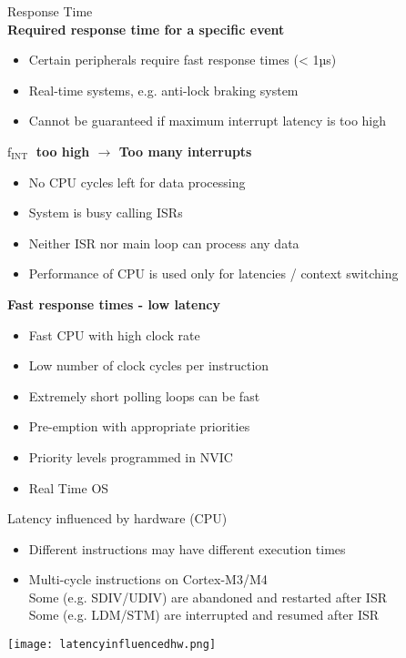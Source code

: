 \begin{corollary}{Response Time}\\
    \textbf{Required response time for a specific event}
    \begin{itemize}
        \item Certain peripherals require fast response times (< 1µs)
        \item Real-time systems, e.g. anti-lock braking system
        \item Cannot be guaranteed if maximum interrupt latency is too high
    \end{itemize}

\textbf{$\mathrm{f}_{\text {INT }}$ too high $\boldsymbol{\rightarrow}$ Too many interrupts}
\begin{itemize}
    \item No CPU cycles left for data processing
    \item System is busy calling ISRs
    \item Neither ISR nor main loop can process any data
    \item Performance of CPU is used only for latencies / context switching
\end{itemize}

\textbf{Fast response times - low latency}
\begin{itemize}
    \item Fast CPU with high clock rate
    \item Low number of clock cycles per instruction
    \item Extremely short polling loops can be fast
    \item Pre-emption with appropriate priorities
    \item Priority levels programmed in NVIC
    \item Real Time OS
\end{itemize}    
\end{corollary}

\begin{theorem}{Latency influenced by hardware (CPU)}
    \begin{itemize}
        \item Different instructions may have different execution times
        \item Multi-cycle instructions on Cortex-M3/M4\\
        \small
        Some (e.g. SDIV/UDIV) are abandoned and restarted after ISR\\
        Some (e.g. LDM/STM) are interrupted and resumed after ISR
    \end{itemize}
    \texttt{[image: latencyinfluencedhw.png]}
\end{theorem}

